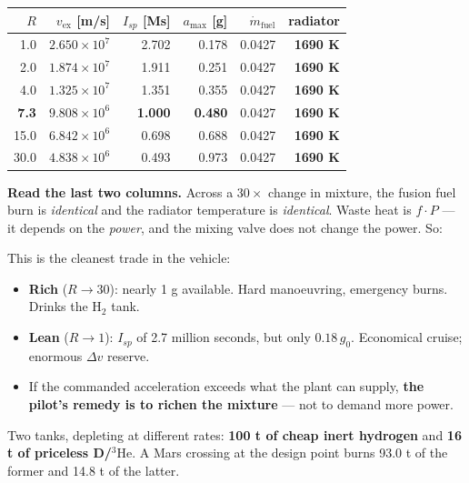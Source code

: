 \documentclass[11pt]{article}
\newcommand{\ve}{v_{\text{ex}}}
\newcommand{\gz}{g_0}
\newcommand{\he}{\ensuremath{{}^3\mathrm{He}}}
\begin{document}
\begin{center}\small
\begin{tabular}{@{}rrrrrr@{}}
\toprule
$R$ & $\ve$ [m/s] & $I_{sp}$ [Ms] & $a_{\max}$ [g] & $\dot m_{\text{fuel}}$ & \textbf{radiator} \\
\midrule
1.0  & $2.650\times10^{7}$ & 2.702 & 0.178 & 0.0427 & \textbf{1690 K}\\
2.0  & $1.874\times10^{7}$ & 1.911 & 0.251 & 0.0427 & \textbf{1690 K}\\
4.0  & $1.325\times10^{7}$ & 1.351 & 0.355 & 0.0427 & \textbf{1690 K}\\
\textbf{7.3} & $9.808\times10^{6}$ & \textbf{1.000} & \textbf{0.480} & 0.0427 & \textbf{1690 K}\\
15.0 & $6.842\times10^{6}$ & 0.698 & 0.688 & 0.0427 & \textbf{1690 K}\\
30.0 & $4.838\times10^{6}$ & 0.493 & 0.973 & 0.0427 & \textbf{1690 K}\\
\bottomrule
\end{tabular}
\end{center}

\textbf{Read the last two columns.} Across a $30\times$ change in mixture, the fusion fuel burn is \emph{identical} and the radiator temperature is \emph{identical}. Waste heat is $f\!\cdot\!P$ --- it depends on the \emph{power}, and the mixing valve does not change the power. So:

\begin{center}
\end{center}

This is the cleanest trade in the vehicle:
\begin{itemize}\itemsep1pt
\item \textbf{Rich} ($R\to30$): nearly 1 g available. Hard manoeuvring, emergency burns. Drinks the H$_2$ tank.
\item \textbf{Lean} ($R\to1$): $I_{sp}$ of 2.7 million seconds, but only $0.18\,\gz$. Economical cruise; enormous $\Delta v$ reserve.
\item If the commanded acceleration exceeds what the plant can supply, \textbf{the pilot's remedy is to richen the mixture} --- not to demand more power.
\end{itemize}
Two tanks, depleting at different rates: \textbf{100 t of cheap inert hydrogen} and \textbf{16 t of priceless D/\he}. A Mars crossing at the design point burns 93.0 t of the former and 14.8 t of the latter.
\end{document}
